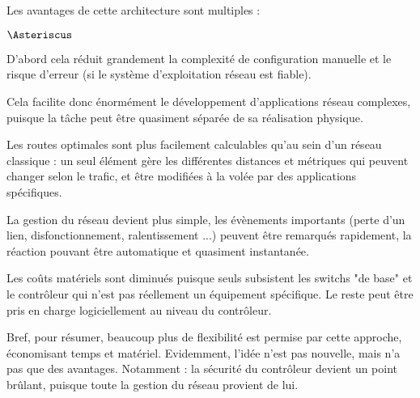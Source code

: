 Les avantages de cette architecture sont multiples :
\begin{list}{$\Asteriscus$}{}
\item D'abord cela réduit grandement la complexité de configuration manuelle et le risque d'erreur (si le système d'exploitation réseau est fiable).
\item Cela facilite donc énormément le développement d'applications réseau complexes, puisque la tâche peut être quasiment séparée de sa réalisation physique.
\item Les routes optimales sont plus facilement calculables qu'au sein d'un réseau classique : un seul élément gère les différentes distances et métriques qui peuvent changer selon le trafic, et être modifiées à la volée par des applications spécifiques.
\item La gestion du réseau devient plus simple, les évènements importants (perte d'un lien, disfonctionnement, ralentissement ...) peuvent être remarqués rapidement, la réaction pouvant être automatique et quasiment instantanée.
\item Les coûts matériels sont diminués puisque seuls subsistent les switchs "de base" et le contrôleur qui n'est pas réellement un équipement spécifique. Le reste peut être pris en charge logiciellement au niveau du contrôleur.
\end{list}

Bref, pour résumer, beaucoup plus de flexibilité est permise par cette approche, économisant temps et matériel. Evidemment, l'idée n'est pas nouvelle, mais n'a pas que des avantages. Notamment : la sécurité du contrôleur devient un point brûlant, puisque toute la gestion du réseau provient de lui.